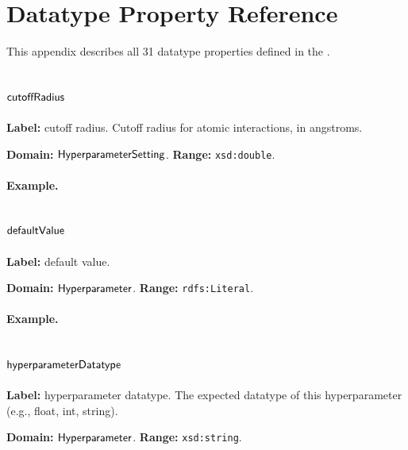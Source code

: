 \section{Datatype Property Reference}
\label{sec:datatype-property-reference}

This appendix describes all 31 datatype properties defined in the \MLIPsOntology{}.

\subsection{$\mathsf{cutoffRadius}$}
\label{sec:term-cutoffRadius}

\textbf{Label:} cutoff radius.
Cutoff radius for atomic interactions, in angstroms.

\textbf{Domain:} $\mathsf{HyperparameterSetting}$.
\textbf{Range:} \texttt{xsd:double}.

\paragraph{Example.}

\subsection{$\mathsf{defaultValue}$}
\label{sec:term-defaultValue}

\textbf{Label:} default value.

\textbf{Domain:} $\mathsf{Hyperparameter}$.
\textbf{Range:} \texttt{rdfs:Literal}.

\paragraph{Example.}

\subsection{$\mathsf{hyperparameterDatatype}$}
\label{sec:term-hyperparameterDatatype}

\textbf{Label:} hyperparameter datatype.
The expected datatype of this hyperparameter (e.g., float, int, string).

\textbf{Domain:} $\mathsf{Hyperparameter}$.
\textbf{Range:} \texttt{xsd:string}.


